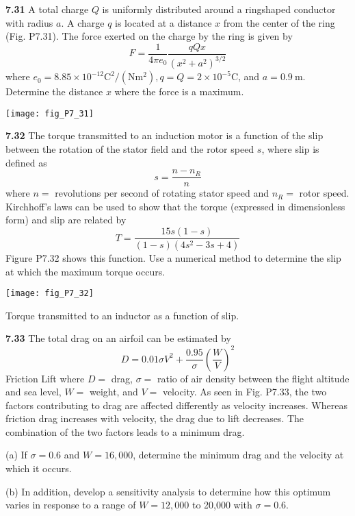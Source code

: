 \documentclass[../main.tex]{subfiles}
\begin{document}
\begin{multicols}{2}
	\noindent \textbf{7.31} A total charge $Q$ is uniformly distributed around a ringshaped conductor with radius $a$. A charge $q$ is located at a distance $x$ from the center of the ring (Fig. P7.31). The force exerted on the charge by the ring is given by
	$$
	F=\frac{1}{4 \pi e_{0}} \frac{q Q x}{\left(x^{2}+a^{2}\right)^{3 / 2}}
	$$
	where $e_{0}=8.85 \times 10^{-12} \mathrm{C}^{2} /\left(\mathrm{N} \mathrm{m}{ }^{2}\right), q=Q=2 \times 10^{-5} \mathrm{C}$, and $a=0.9 \mathrm{~m}$. Determine the distance $x$ where the force is a maximum.
	
	\begin{center}
	\texttt{[image: fig\_P7\_31]}
	\end{center}

	\noindent \textbf{7.32} The torque transmitted to an induction motor is a function of the slip between the rotation of the stator field and the rotor speed $s$, where slip is defined as
	$$
	s=\frac{n-n_{R}}{n}
	$$
	where $n=$ revolutions per second of rotating stator speed and $n_{R}=$ rotor speed. Kirchhoff's laws can be used to show that the torque (expressed in dimensionless form) and slip are related by
	$$
	T=\frac{15 s(1-s)}{(1-s)\left(4 s^{2}-3 s+4\right)}
	$$
	Figure P7.32 shows this function. Use a numerical method to determine the slip at which the maximum torque occurs. 
	
	\begin{center}
	\texttt{[image: fig\_P7\_32]}
		
	\textsf{Torque transmitted to an inductor as a function of slip.}
	\end{center}

	\noindent \textbf{7.33} The total drag on an airfoil can be estimated by
	$$
	D=0.01 \sigma V^{2}+\frac{0.95}{\sigma}\left(\frac{W}{V}\right)^{2}
	$$
	Friction Lift
	where $D=$ drag, $\sigma=$ ratio of air density between the flight altitude and sea level, $W=$ weight, and $V=$ velocity. As seen in Fig. P7.33, the two factors contributing to drag are affected differently as velocity increases. Whereas friction drag increases with velocity, the drag due to lift decreases. The combination of the two factors leads to a minimum drag.
	
	(a) If $\sigma=0.6$ and $W=16,000$, determine the minimum drag and the velocity at which it occurs.
	
	(b) In addition, develop a sensitivity analysis to determine how this optimum varies in response to a range of $W=12,000$ to 20,000 with $\sigma=0.6$.
	

\end{multicols}
\end{document}
